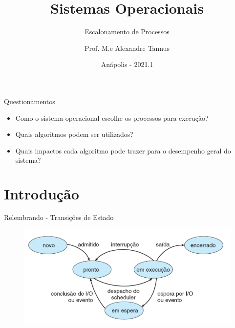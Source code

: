 \documentclass[aspectratio=169,
				xcolor=table]{beamer}
\institute[]{\uppercase{Engenharia de Software}}
\title[]{Sistemas Operacionais}
\subtitle[]{Escalonamento de Processos }
\author[]{Prof. M.e Alexandre Tannus}
\date{Anápolis - 2021.1}
\begin{document}
	\begin{frame}
		\titlepage
	\end{frame}

	\begin{frame}
		\tableofcontents
	\end{frame}	
	
	
	\begin{frame}{Questionamentos}
		\begin{itemize}
			\item Como o sistema operacional escolhe os processos para execução?
			\vspace{1em}
			\item Quais algoritmos podem ser utilizados?
			\vspace{1em}
			\item Quais impactos cada algoritmo pode trazer para o desempenho geral do sistema?
		\end{itemize}
	\end{frame}

	\section{Introdução}
	\begin{frame}{Relembrando - Transições de Estado}		
		\begin{figure}[hbtp]
			\centering
			\includegraphics[keepaspectratio, width=.9\textwidth]{../figs/cap03/estados.png}	
		\end{figure} 
	\end{frame}	
	
\end{document}
